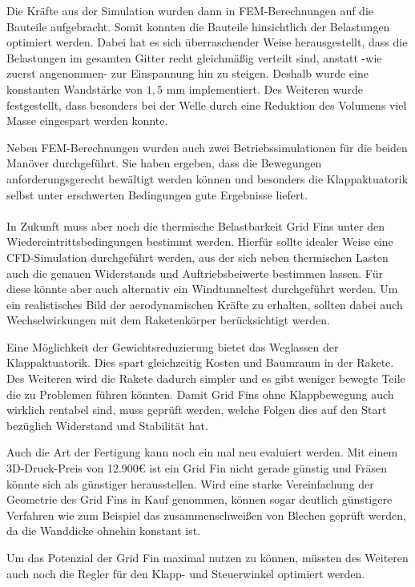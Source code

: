 Die Kräfte aus der Simulation wurden dann in FEM-Berechnungen auf die Bauteile aufgebracht. Somit konnten die Bauteile hinsichtlich der Belastungen optimiert werden. Dabei hat es sich überraschender Weise herausgestellt, dass die Belastungen im gesamten Gitter recht gleichmäßig verteilt sind, anstatt -wie zuerst angenommen- zur Einspannung hin zu steigen. Deshalb wurde eine konstanten Wandstärke von $1,5$ mm implementiert. Des Weiteren wurde festgestellt, dass besonders bei der Welle durch eine Reduktion des Volumens viel Masse eingespart werden konnte.

Neben FEM-Berechnungen wurden auch zwei Betriebssimulationen für die beiden Manöver durchgeführt. Sie haben ergeben, dass die Bewegungen anforderungsgerecht bewältigt werden können und besonders die Klappaktuatorik selbst unter erschwerten Bedingungen gute Ergebnisse liefert. 
\\~\\
In Zukunft muss aber noch die thermische Belastbarkeit Grid Fins unter den Wiedereintrittsbedingungen bestimmt werden. Hierfür sollte idealer Weise eine CFD-Simulation durchgeführt werden, aus der sich neben thermischen Lasten auch die genauen Widerstands und Auftriebsbeiwerte bestimmen lassen. Für diese könnte aber auch alternativ ein Windtunneltest durchgeführt werden. Um ein realistisches Bild der aerodynamischen Kräfte zu erhalten, sollten dabei auch Wechselwirkungen mit dem Raketenkörper berücksichtigt werden.

Eine Möglichkeit der Gewichtsreduzierung bietet das Weglassen der Klappaktuatorik. Dies spart gleichzeitig Kosten und Baumraum in der Rakete. Des Weiteren wird die Rakete dadurch simpler und es gibt weniger bewegte Teile die zu Problemen führen könnten. Damit Grid Fins ohne Klappbewegung auch wirklich rentabel sind, muss geprüft werden, welche Folgen dies auf den Start bezüglich Widerstand und Stabilität hat.

Auch die Art der Fertigung kann noch ein mal neu evaluiert werden. Mit einem 3D-Druck-Preis von 12.900€ ist ein Grid Fin nicht gerade günstig und Fräsen könnte sich als günstiger herausstellen. Wird eine starke Vereinfachung der Geometrie des Grid Fins in Kauf genommen, können sogar deutlich günstigere Verfahren wie zum Beispiel das zusammenschweißen von Blechen geprüft werden, da die Wanddicke ohnehin konstant ist.

Um das Potenzial der Grid Fin maximal nutzen zu können, müssten des Weiteren auch noch die Regler für den Klapp- und Steuerwinkel optimiert werden.